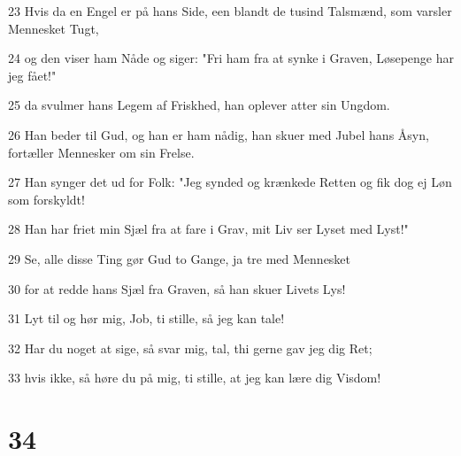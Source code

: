 \par 23 Hvis da en Engel er på hans Side, een blandt de tusind Talsmænd, som varsler Mennesket Tugt,
\par 24 og den viser ham Nåde og siger: "Fri ham fra at synke i Graven, Løsepenge har jeg fået!"
\par 25 da svulmer hans Legem af Friskhed, han oplever atter sin Ungdom.
\par 26 Han beder til Gud, og han er ham nådig, han skuer med Jubel hans Åsyn, fortæller Mennesker om sin Frelse.
\par 27 Han synger det ud for Folk: "Jeg synded og krænkede Retten og fik dog ej Løn som forskyldt!
\par 28 Han har friet min Sjæl fra at fare i Grav, mit Liv ser Lyset med Lyst!"
\par 29 Se, alle disse Ting gør Gud to Gange, ja tre med Mennesket
\par 30 for at redde hans Sjæl fra Graven, så han skuer Livets Lys!
\par 31 Lyt til og hør mig, Job, ti stille, så jeg kan tale!
\par 32 Har du noget at sige, så svar mig, tal, thi gerne gav jeg dig Ret;
\par 33 hvis ikke, så høre du på mig, ti stille, at jeg kan lære dig Visdom!

\chapter{34}

